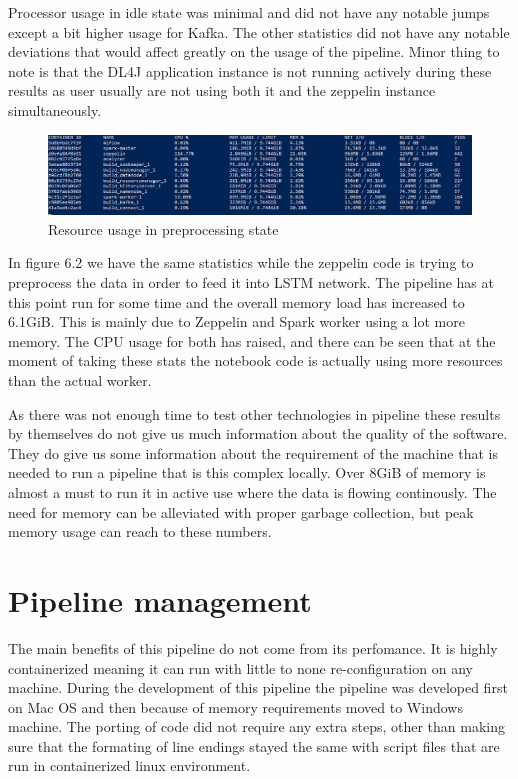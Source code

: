 Processor usage in idle state was minimal and did not have any notable jumps except a bit higher usage for Kafka.
The other statistics did not have any notable deviations that would affect greatly on the usage of the pipeline. 
Minor thing to note is that the DL4J application instance is not running actively during these results as user usually are not using both it and the zeppelin instance simultaneously.

\begin{figure}[ht!]
    \includegraphics[scale=0.45]{images/memory2} 
    \centering
    \caption{Resource usage in preprocessing state}
\end{figure}

In figure 6.2 we have the same statistics while the zeppelin code is trying to preprocess the data in order to feed it into LSTM network.
The pipeline has at this point run for some time and the overall memory load has increased to 6.1GiB.
This is mainly due to Zeppelin and Spark worker using a lot more memory.
The CPU usage for both has raised, and there can be seen that at the moment of taking these stats the notebook code is actually using more resources than the actual worker.

As there was not enough time to test other technologies in pipeline these results by themselves do not give us much information about the quality of the software.
They do give us some information about the requirement of the machine that is needed to run a pipeline that is this complex locally.
Over 8GiB of memory is almost a must to run it in active use where the data is flowing continously.
The need for memory can be alleviated with proper garbage collection, but peak memory usage can reach to these numbers.

\section{Pipeline management}

The main benefits of this pipeline do not come from its perfomance.
It is highly containerized meaning it can run with little to none re-configuration on any machine.
During the development of this pipeline the pipeline was developed first on Mac OS and then because of memory requirements moved to Windows machine.
The porting of code did not require any extra steps, other than making sure that the formating of line endings stayed the same with script files that are run in containerized linux environment.

